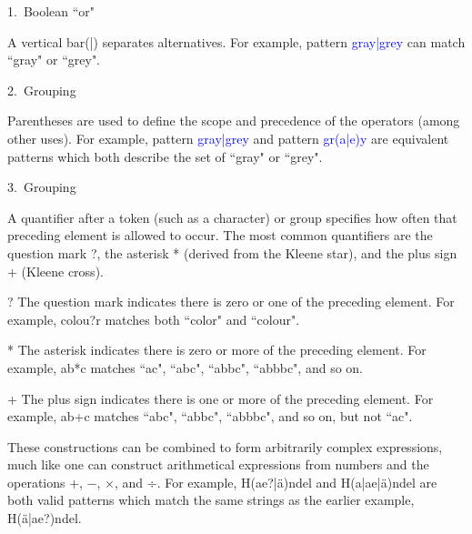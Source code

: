 \begin{compactitem}
\item[1.~\textsf{Boolean ``or"}]  

A vertical bar(\textsf{|}) separates alternatives. For example, \textsf{pattern} \textcolor{Blue}{\textsf{gray|grey}} can match ``\textsf{gray}" or ``\textsf{grey}".

\item[2.~\textsf{Grouping}]

Parentheses are used to define the scope and precedence of the operators (among other uses). For example, \textsf{pattern} \textcolor{Blue}{\textsf{gray|grey}} and \textsf{pattern} \textcolor{Blue}{\textsf{gr(a|e)y}} are equivalent patterns which both describe the set of ``gray" or ``grey".

\item[3.~\textsf{Grouping}]

A quantifier after a token (such as a character) or group specifies how often that preceding element is allowed to occur. The most common quantifiers are the question mark \textsf{?}, the asterisk \textsf{*} (derived from the Kleene star), and the plus sign \textsf{+} (Kleene cross).

\begin{compactitem}
\item[\textsf{?}] The question mark indicates there is zero or one of the preceding element. For example, \textsf{colou?r} matches both ``\textsf{color}" and ``\textsf{colour}".
\item[\textsf{*}] The asterisk indicates there is zero or more of the preceding element. For example, \textsf{ab*c} matches ``\textsf{ac}", ``\textsf{abc}", ``\textsf{abbc}", ``\textsf{abbbc}", and so on.
\item[\textsf{+}] The plus sign indicates there is one or more of the preceding element. For example, \textsf{ab+c} matches ``\textsf{abc}", ``\textsf{abbc}", ``\textsf{abbbc}", and so on, but not ``\textsf{ac}".
\end{compactitem}

\end{compactitem}


These constructions can be combined to form arbitrarily complex expressions, much like one can construct arithmetical expressions from numbers and the operations +, −, ×, and ÷. For example, \textsf{H(ae?|ä)ndel} and \textsf{H(a|ae|ä)ndel} are both valid patterns which match the same strings as the earlier example, \textsf{H(ä|ae?)ndel}.

